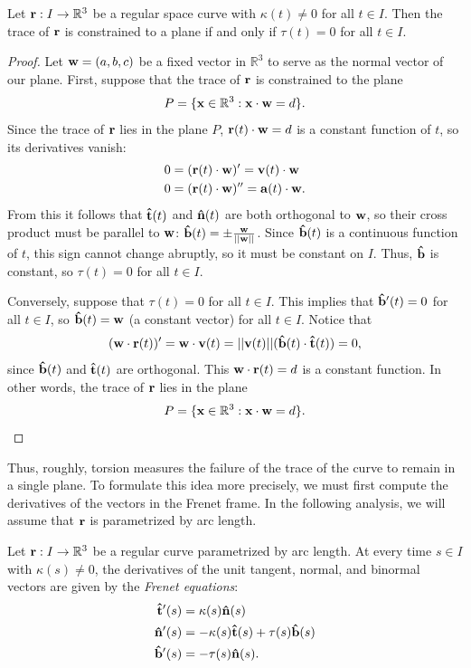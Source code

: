 \documentclass[12pt,letterpaper,reqno]{article}
\numberwithin{equation}{section}
\newcommand{\R}{\ensuremath{\mathbb R}}
\newcommand{\bv}{{\bf v}}
\newcommand{\bw}{{\bf w}}
\newcommand{\bx}{{\bf x}}
\newcommand{\ba}{{\bf a}}
\newcommand{\bbr}{{\bf r}}
\newcommand{\ut}{{\bf {\hat{t}}}}
\newcommand{\un}{{\bf {\hat{n}}}}
\newcommand{\ub}{{\bf {\hat{b}}}}
\begin{document}
{\begin{prop}
Let $\bbr:I \to \mathbb{R}^3$ be a regular space curve with $\kappa(t) \neq 0$ for all $t \in I$. Then the trace of $\bbr$ is constrained to a plane if and only if $\tau(t)=0$ for all $t \in I$.	
\end{prop}

\begin{proof}
	Let $\bw=(a,b,c)$ be a fixed vector in $\R^3$ to serve as the normal vector of our plane. First, suppose that the trace of $\bbr$ is constrained to the plane $$P=\{\bx \in \mathbb{R}^3:\bx \cdot \bw=d\}.$$
	 Since the trace of $\bbr$ lies in the plane $P$, $\bbr(t)\cdot \bw=d$ is a constant function of $t$, so its derivatives vanish:
	\begin{align*}
		0&=(\bbr(t)\cdot \bw)'=\bv(t)\cdot \bw \\
		0&=(\bbr(t)\cdot \bw)''=\ba(t)\cdot \bw.
	\end{align*}
	From this it follows that $\ut(t)$ and $\un(t)$ are both orthogonal to $\bw$, so their cross product must be parallel to $\bw$: $\ub(t)=\pm\frac{\bw}{||\bw||}$. Since $\ub(t)$ is a continuous function of $t$, this sign cannot change abruptly, so it must be constant on $I$. Thus, $\ub$ is constant, so $\tau(t)=0$ for all $t \in I$.
	
	Conversely, suppose that $\tau(t)=0$ for all $t \in I$. This implies that $\ub'(t)=0$ for all $t \in I$, so $\ub(t)=\bw$ (a constant vector) for all $t \in I$. Notice that
	\begin{align*}
		(\bw \cdot \bbr(t))'=\bw\cdot \bv(t)=||\bv(t)||(\ub(t) \cdot \ut(t))=0,
	\end{align*} 
	since $\ub(t)$ and $\ut(t)$ are orthogonal. This $\bw \cdot \bbr(t)=d$ is a constant function. In other words, the trace of $\bbr$ lies in the plane 
	\begin{align*}
		P=\{\bx \in \mathbb{R}^3:\bx \cdot \bw=d\}.
	\end{align*}
\end{proof}

Thus, roughly, torsion measures the failure of the trace of the curve to remain in a single plane. To formulate this idea more precisely, we must first compute the derivatives of the vectors in the Frenet frame. In the following analysis, we will assume that $\bbr$ is parametrized by arc length.

\begin{prop}\label{prop:frenet_equations}
	Let $\bbr:I \to \mathbb{R}^3$ be a regular curve parametrized by arc length. At every time $s \in I$ with $\kappa(s) \neq 0$, the derivatives of the unit tangent, normal, and binormal vectors are given by the \emph{Frenet equations}:
	\begin{align*}
		\ut'(s)&= \kappa(s) \un(s) \\
		\un'(s)&=-\kappa(s)\ut(s)+\tau(s) \ub(s) \\
		\ub'(s)&=-\tau(s) \un(s).
	\end{align*}
\end{prop}

}
\end{document}
